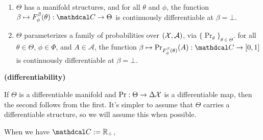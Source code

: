 \documentclass{article}
\def\confdom{\mathdcal C}
\def\Rplus{\mathbb R_+}
\begin{document}
\begin{CFaxioms}
	\item \label{ax:diffble}
	\begin{enumerate}
	\item $\Theta$ has a manifold structures, and
		for all $\theta$ and $\phi$, the function $\beta \mapsto F^{\beta}_\phi(\theta) : \confdom \to \Theta$
		is continuously differentiable at $\beta = \bot$. %
	\item 
		$\Theta$ parameterizes a family of probabilities over $(\mathcal X, \mathcal A)$,
		via $\{ \Pr_\theta \}_{\theta \in \Theta}$.
		for all $\theta \in \Theta$, $\phi \in \Phi$, and  $A \in \mathcal A$,
		the function $\beta \mapsto \Pr_{F^{\beta}_\phi(\theta)}(A)
		: \confdom \to \mathbb [0,1]$ is
		continuously differentiable at $\beta=\bot$. 
			\label{ax:diffble2}
	\end{enumerate}
	\hfill \textbf{(differentiability)}
\end{CFaxioms}


If $\Theta$ is a differentiable manifold and $\Pr: \Theta \to \Delta\mathcal X$ is a differentiable map, then the second follows from the first. 
It's simpler to assume that $\Theta$ carries a differentiable structure, so we will assume this when possible.

When we have $\confdom := \Rplus$,
\end{document}
